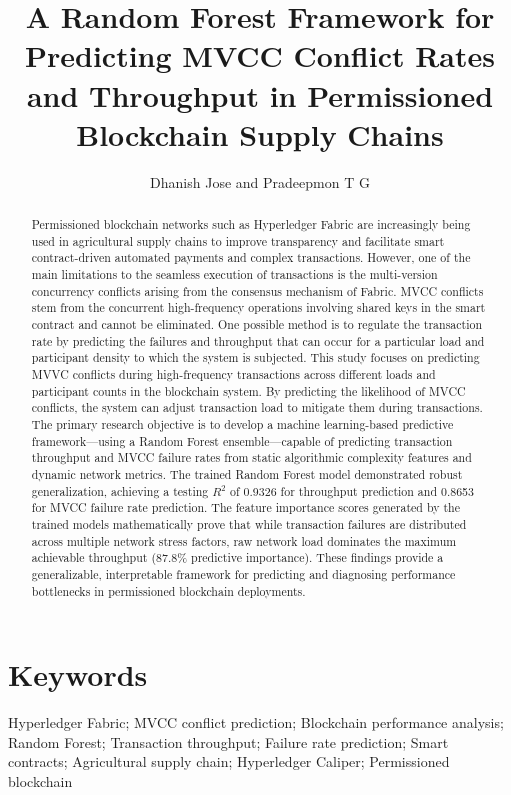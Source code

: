 \documentclass[12pt]{article}
\title{A Random Forest Framework for Predicting MVCC Conflict Rates and Throughput in Permissioned Blockchain Supply Chains}
\author{Dhanish Jose and Pradeepmon T G}
\affil{Department of Mechanical Engineering, National Institute of Technology Calicut, India}
\date{}
\begin{document}
	
	\maketitle
		\begin{abstract}
	Permissioned blockchain networks such as Hyperledger Fabric are increasingly being used in agricultural supply chains to improve transparency and facilitate smart contract-driven automated payments and complex transactions. However, one of the main limitations to the seamless execution of transactions is the multi-version concurrency conflicts arising from the consensus mechanism of Fabric. MVCC conflicts stem from the concurrent high-frequency operations involving shared keys in the smart contract and cannot be eliminated. One possible method is to regulate the transaction rate by predicting the failures and throughput that can occur for a particular load and participant density to which the system is subjected. This study focuses on predicting MVVC conflicts during high-frequency transactions across different loads and participant counts in the blockchain system. By predicting the likelihood of MVCC conflicts, the system can adjust transaction load to mitigate them during transactions. The primary research objective is to develop a machine learning-based predictive framework—using a Random Forest ensemble—capable of predicting transaction throughput and MVCC failure rates from static algorithmic complexity features and dynamic network metrics. The trained Random Forest model demonstrated robust generalization, achieving a testing $R^2$ of 0.9326 for throughput prediction and 0.8653 for MVCC failure rate prediction. The feature importance scores generated by the trained models mathematically prove that while transaction failures are distributed across multiple network stress factors, raw network load dominates the maximum achievable throughput (87.8\% predictive importance). These findings provide a generalizable, interpretable framework for predicting and diagnosing performance bottlenecks in permissioned blockchain deployments.
	\end{abstract}
	
	
	
	
	
	\section*{Keywords}
	Hyperledger Fabric; MVCC conflict prediction; Blockchain performance analysis; 
	Random Forest; Transaction throughput; Failure rate prediction; Smart contracts; 
	Agricultural supply chain; Hyperledger Caliper; Permissioned blockchain
	
\end{document}
